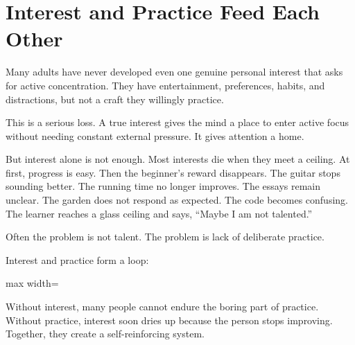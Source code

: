 \section*{Interest and Practice Feed Each Other}

Many adults have never developed even one genuine personal interest that asks for active concentration. They have entertainment, preferences, habits, and distractions, but not a craft they willingly practice.

This is a serious loss. A true interest gives the mind a place to enter active focus without needing constant external pressure. It gives attention a home.

But interest alone is not enough. Most interests die when they meet a ceiling. At first, progress is easy. Then the beginner's reward disappears. The guitar stops sounding better. The running time no longer improves. The essays remain unclear. The garden does not respond as expected. The code becomes confusing. The learner reaches a glass ceiling and says, ``Maybe I am not talented.''

Often the problem is not talent. The problem is lack of deliberate practice.

Interest and practice form a loop:

\begin{center}
\begin{adjustbox}{max width=\linewidth}
\end{adjustbox}
\end{center}

Without interest, many people cannot endure the boring part of practice. Without practice, interest soon dries up because the person stops improving. Together, they create a self-reinforcing system.

